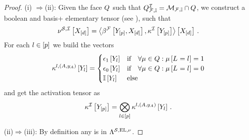 \begin{proof}
(i)
    $\Rightarrow$(ii):
    Given the face $Q$ such that $Q^{\mathcal{I}}_{\mathcal{F},\mathbb{I}}=\mathcal{M}_{\mathcal{F},\mathbb{I}}\cap Q$, we construct a boolean and basis+ elementary tensor (see ), such that
    \begin{align*}
        \nu^{\mathcal{S},\mathcal{I}}\left[X_{[d]}\right]
        = \left\langle \beta^{\mathcal{F}}\left[Y_{[p]},X_{[d]}\right],\kappa^{\mathcal{I}}\left[Y_{[p]}\right]\right\rangle \left[ X_{[d]} \right] \, .
    \end{align*}
    For each $l\in[p]$ we build the vectors
    \begin{align*}
        \kappa^{l,(A,y_{A})}\left[Y_{l}\right]
        = \begin{cases}
              \epsilon_{1}\left[Y_{l}\right] & \text{if}\quad \forall{\mu\in Q}:{\mu\left[L_{}=l_{}\right]=1} \\
              \epsilon_{0}\left[Y_{l}\right] & \text{if}\quad \forall{\mu\in Q}:{\mu\left[L_{}=l_{}\right]=0} \\
              \mathbb{I}\left[Y_{l}\right] & \text{else}
        \end{cases}
    \end{align*}
    and get the activation tensor as
    \begin{align*}
        \kappa^{\mathcal{I}}\left[Y_{[p]}\right]
        = \bigotimes_{l\in[p]} \kappa^{l,(A,y_{A})}\left[Y_{l}\right] \, .
    \end{align*}

    (ii)$\Rightarrow$(iii):
    By definition any \HardLogicNetwork{} is in $\Lambda^{\mathcal{S},\mathrm{EL},\nu}$.


\end{proof}
